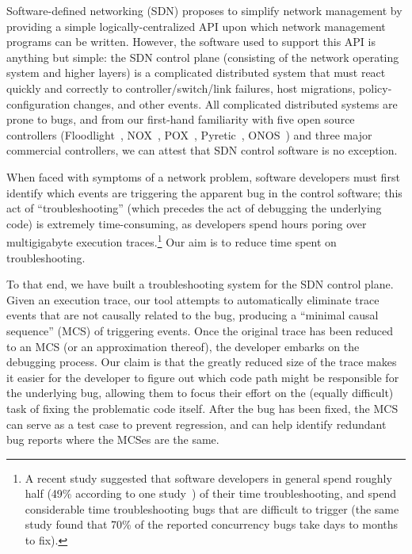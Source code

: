 Software-defined networking (SDN) proposes to simplify network management by
providing a simple logically-centralized API upon which network management
programs can be written. However, the software used to support this API is
anything but simple: the SDN control plane (consisting of the network
operating system and higher layers) is a complicated distributed system that
must react quickly and correctly to controller/switch/link failures, host migrations,
policy-configuration changes, and other events.
All complicated distributed systems are prone to bugs, and from our first-hand
familiarity with five open source controllers (Floodlight~\cite{floodlight}, NOX~\cite{nox},
POX~\cite{pox}, Pyretic~\cite{frenetic}, ONOS~\cite{ONOS}) and three major commercial
controllers, we can attest that SDN control software is no exception.

When faced with symptoms of a network problem,
software developers must first identify which events are triggering
the apparent bug in the control software; this act of ``troubleshooting'' (which precedes the act of debugging the
underlying code) is extremely time-consuming, as developers spend hours poring
over multigigabyte execution traces.\footnote{A recent study suggested that software developers in general spend roughly half (49\% according to one
study~\cite{msoft_concurrency}) of their time troubleshooting, and spend
considerable time troubleshooting bugs that are difficult to trigger (the same study found
that 70\% of the reported concurrency bugs take days to months to fix).}
Our aim is to reduce time spent on troubleshooting.

To that end, we have built a troubleshooting system for the SDN control plane.
Given an execution trace, our tool attempts to automatically eliminate
trace events that are not causally related to the bug, producing a ``minimal
causal sequence'' (MCS) of triggering events. Once the original trace has
been reduced to an MCS (or an approximation thereof), the developer embarks
on the debugging process. Our claim is that the greatly reduced size of the
trace makes it easier for the developer to figure out which code path might be
responsible for the underlying bug, allowing them to focus their effort on
the (equally difficult) task of fixing the problematic code itself. After the bug has been fixed, the MCS
can serve as a test case to prevent regression,
and can help identify redundant bug reports where the MCSes are the same.

